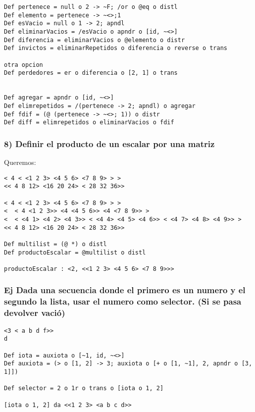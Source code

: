 \begin{verbatim}
Def pertenece = null o 2 -> ~F; /or o @eq o distl
Def elemento = pertenece -> ~<>;1
Def esVacio = null o 1 -> 2; apndl
Def eliminarVacios = /esVacio o apndr o [id, ~<>]
Def diferencia = eliminarVacios o @elemento o distr
Def invictos = eliminarRepetidos o diferencia o reverse o trans

otra opcion
Def perdedores = er o diferencia o [2, 1] o trans


Def agregar = apndr o [id, ~<>]
Def elimrepetidos = /(pertenece -> 2; apndl) o agregar
Def fdif = (@ (pertenece -> ~<>; 1)) o distr
Def diff = elimrepetidos o eliminarVacios o fdif
\end{verbatim}



\subsubsection*{8) Definir el producto de un escalar por una matriz}

Queremos:
\begin{verbatim}
< 4 < <1 2 3> <4 5 6> <7 8 9> > >
<< 4 8 12> <16 20 24> < 28 32 36>>

< 4 < <1 2 3> <4 5 6> <7 8 9> > >
<  < 4 <1 2 3>> <4 <4 5 6>> <4 <7 8 9>> >
<  < <4 1> <4 2> <4 3>> < <4 4> <4 5> <4 6>> < <4 7> <4 8> <4 9>> >
<< 4 8 12> <16 20 24> < 28 32 36>>

Def multilist = (@ *) o distl
Def productoEscalar = @multilist o distl

productoEscalar : <2, <<1 2 3> <4 5 6> <7 8 9>>>
\end{verbatim}


\subsubsection*{Ej Dada una secuencia donde el primero es un numero y el segundo la lista, usar el numero como selector. (Si se pasa devolver vació)}
\begin{verbatim}
<3 < a b d f>>
d

Def iota = auxiota o [~1, id, ~<>]
Def auxiota = (> o [1, 2] -> 3; auxiota o [+ o [1, ~1], 2, apndr o [3, 1]])

Def selector = 2 o 1r o trans o [iota o 1, 2]

[iota o 1, 2] da <<1 2 3> <a b c d>>
\end{verbatim}

